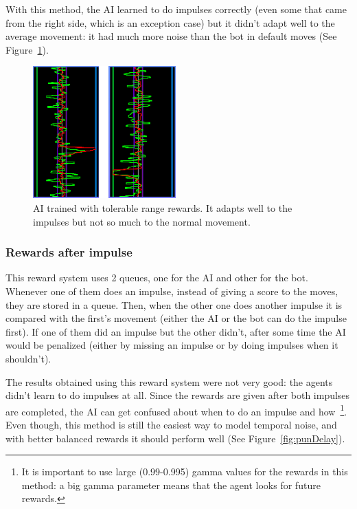 With this method, the AI learned to do impulses correctly (even some that came from the right side, which is an exception case) but it didn't adapt well to the average movement: it had much more noise than the bot in default moves (See Figure~\ref{fig:timeTR}).

\begin{figure}[h]
  \centering
		\includegraphics[width=.6\textwidth]{img/timeTR.png}
  \caption{AI trained with tolerable range rewards. It adapts well to the impulses but not so much to the normal movement.}
  \label{fig:timeTR}
\end{figure}

\subsubsection{Rewards after impulse}
\label{sec:afterimpulse}

This reward system uses 2 queues, one for the AI and other for the bot. Whenever one of them does an impulse, instead of giving a score to the moves, they are stored in a queue. Then, when the other one does another impulse it is compared with the first's movement (either the AI or the bot can do the impulse first). If one of them did an impulse but the other didn't, after some time the AI would be penalized (either by missing an impulse or by doing impulses when it shouldn't).

The results obtained using this reward system were not very good: the agents didn't learn to do impulses at all. Since the rewards are given after both impulses are completed, the AI can get confused about when to do an impulse and how~\footnote{It is important to use large (0.99-0.995) gamma values for the rewards in this method: a big gamma parameter means that the agent looks for future rewards.}. Even though, this method is still the easiest way to model temporal noise, and with better balanced rewards it should perform well (See Figure~\ref{fig:punDelay}).

